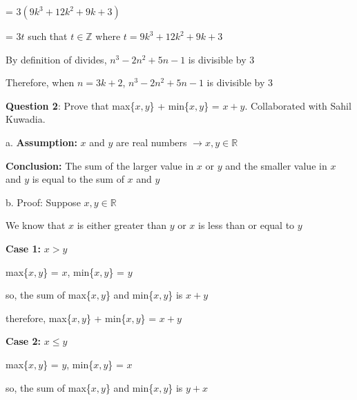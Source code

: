 \documentclass{article} %
\newcommand{\question}[2][]{\begin{flushleft}
        \textbf{Question #1}: #2
\end{flushleft}}
\begin{document}
    \tabto*{3.4cm} = $3(9k^3 + 12k^2 + 9k + 3)$

    \tabto*{3.4cm} = $3t$ such that $t \in \mathbb{Z}$ where $t = 9k^3 + 12k^2 + 9k + 3$

    By definition of divides, $n^3-2n^2+5n-1$ is divisible by 3

    Therefore, when $n = 3k + 2$, $n^3-2n^2+5n-1$ is divisible by 3

    \newpage


    \question[2]{Prove that max\{$x, y$\} + min\{$x, y$\} = $x + y$. Collaborated with Sahil Kuwadia.}

    a. \textbf{Assumption:} $x$ and $y$ are real numbers $\rightarrow x,y \in \mathbb{R}$

    \tabto{1cm}\textbf{Conclusion:} The sum of the larger value in $x$ or $y$ and the smaller value in $x$ and $y$ is equal
    \tabto{1.05cm}to the sum of $x$ and $y$

    \vspace*{0.3cm}

    b. Proof: Suppose $x, y \in \mathbb{R}$

    \tabto{1cm} We know that $x$ is either greater than $y$ or $x$ is less than or equal to $y$

    \vspace*{0.1cm}

    \tabto{1cm} \textbf{Case 1:} $x > y$

    \tabto{1.3cm} max\{$x, y$\} = $x$, min\{$x, y$\} = $y$

    \tabto{1.3cm} so, the sum of max\{$x, y$\} and min\{$x, y$\} is $x + y$

    \tabto{1.3cm} therefore, max\{$x, y$\} + min\{$x, y$\} = $x + y$

    \vspace*{0.1cm}

    \tabto{1cm} \textbf{Case 2:} $x \leq y$

    \tabto{1.3cm} max\{$x, y$\} = $y$, min\{$x, y$\} = $x$

    \tabto{1.3cm} so, the sum of max\{$x, y$\} and min\{$x, y$\} is $y + x$
\end{document}
